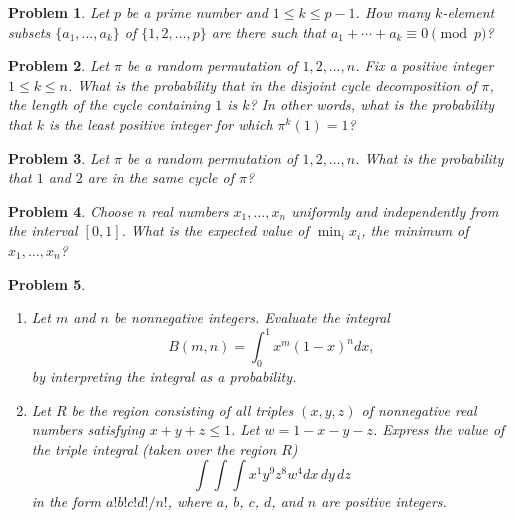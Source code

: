 \documentclass[12pt]{article}
\newtheorem{problem}{Problem}
\begin{document}
\begin{problem}
Let $p$ be a prime number and $1 \leq k \leq p-1$. How many $k$-element subsets $\{a_1,\ldots,a_k\}$ of $\{1,2,\ldots,p\}$ are there such that $a_1+\cdots+a_k \equiv 0 \pmod{p}$?
\end{problem}

\begin{problem}
\textbf{\textcolor{red}{\heart}} Let $\pi$ be a random permutation of $1,2,\ldots,n$. Fix a positive integer $1 \leq k \leq n$. What is the probability that in the disjoint cycle decomposition of $\pi$, the length of the cycle containing $1$ is $k$? In other words, what is the probability that $k$ is the least positive integer for which $\pi^k(1)=1$?
\end{problem}

\begin{problem}
Let $\pi$ be a random permutation of $1,2,\ldots,n$. What is the probability that $1$ and $2$ are in the same cycle of $\pi$?
\end{problem}

\begin{problem}
Choose $n$ real numbers $x_1,\ldots,x_n$ uniformly and independently from the interval $[0,1]$. What is the expected value of $\min_i x_i$, the minimum of $x_1,\ldots,x_n$?
\end{problem}

\begin{problem}
    \begin{enumerate}
        \item \textbf{\textcolor{red}{\heart}} Let $m$ and $n$ be nonnegative integers. Evaluate the integral
        \[
        B(m,n) = \int_0^1 x^m (1-x)^n dx,
        \]
        by interpreting the integral as a probability.
        \item Let $R$ be the region consisting of all triples $(x,y,z)$ of nonnegative real numbers satisfying $x+y+z\leq 1$. Let $w = 1-x-y-z$. Express the value of the triple integral (taken over the region $R$)
        \[
        \int\!\!\!\int\!\!\!\int x^1 y^9 z^8 w^4 dx\,dy\,dz
        \]
        in the form $a! b! c! d! / n!$, where $a$, $b$, $c$, $d$, and $n$ are positive integers.
    \end{enumerate}
\end{problem}
\end{document}
